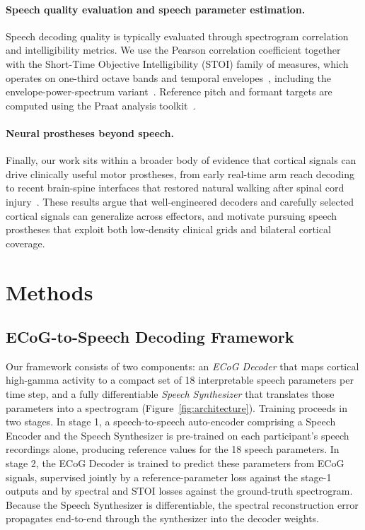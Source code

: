 \documentclass[10pt]{article}
\begin{document}
\paragraph{Speech quality evaluation and speech parameter estimation.}
Speech decoding quality is typically evaluated through spectrogram correlation and intelligibility metrics. We use the Pearson correlation coefficient together with the Short-Time Objective Intelligibility (STOI) family of measures, which operates on one-third octave bands and temporal envelopes~\cite{taal2011algorithm}, including the envelope-power-spectrum variant~\cite{relanoiborra2016sepsm}. Reference pitch and formant targets are computed using the Praat analysis toolkit~\cite{boersma2001praat}.

\paragraph{Neural prostheses beyond speech.}
Finally, our work sits within a broader body of evidence that cortical signals can drive clinically useful motor prostheses, from early real-time arm reach decoding~\cite{wessberg2000realtime} to recent brain-spine interfaces that restored natural walking after spinal cord injury~\cite{lorach2023walking}. These results argue that well-engineered decoders and carefully selected cortical signals can generalize across effectors, and motivate pursuing speech prostheses that exploit both low-density clinical grids and bilateral cortical coverage.

\section{Methods}

\subsection{ECoG-to-Speech Decoding Framework}

Our framework consists of two components: an \emph{ECoG Decoder} that maps cortical high-gamma activity to a compact set of 18 interpretable speech parameters per time step, and a fully differentiable \emph{Speech Synthesizer} that translates those parameters into a spectrogram (Figure~\ref{fig:architecture}). Training proceeds in two stages. In stage 1, a speech-to-speech auto-encoder comprising a Speech Encoder and the Speech Synthesizer is pre-trained on each participant's speech recordings alone, producing reference values for the 18 speech parameters. In stage 2, the ECoG Decoder is trained to predict these parameters from ECoG signals, supervised jointly by a reference-parameter loss against the stage-1 outputs and by spectral and STOI losses against the ground-truth spectrogram. Because the Speech Synthesizer is differentiable, the spectral reconstruction error propagates end-to-end through the synthesizer into the decoder weights.
\end{document}
